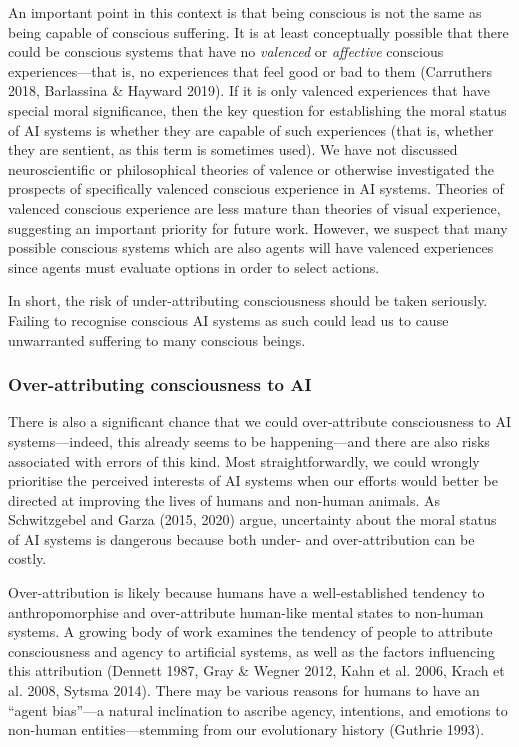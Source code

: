 \documentclass[12pt]{article}
\begin{document}
An important point in this context is that being conscious is not the same as being capable of conscious suffering. It is at least conceptually possible that there could be conscious systems that have no \textit{valenced} or \textit{affective} conscious experiences—that is, no experiences that feel good or bad to them (Carruthers 2018, Barlassina \& Hayward 2019). If it is only valenced experiences that have special moral significance, then the key question for establishing the moral status of AI systems is whether they are capable of such experiences (that is, whether they are sentient, as this term is sometimes used). We have not discussed neuroscientific or philosophical theories of valence or otherwise investigated the prospects of specifically valenced conscious experience in AI systems. Theories of valenced conscious experience are less mature than theories of visual experience, suggesting an important priority for future work. However, we suspect that many possible conscious systems which are also agents will have valenced experiences since agents must evaluate options in order to select actions.

In short, the risk of under-attributing consciousness should be taken seriously. Failing to recognise conscious AI systems as such could lead us to cause unwarranted suffering to many conscious beings.

\subsubsection{Over-attributing consciousness to AI}

There is also a significant chance that we could over-attribute consciousness to AI systems—indeed, this already seems to be happening—and there are also risks associated with errors of this kind. Most straightforwardly, we could wrongly prioritise the perceived interests of AI systems when our efforts would better be directed at improving the lives of humans and non-human animals. As Schwitzgebel and Garza (2015, 2020) argue, uncertainty about the moral status of AI systems is dangerous because both under- and over-attribution can be costly.

Over-attribution is likely because humans have a well-established tendency to anthropomorphise and over-attribute human-like mental states to non-human systems. A growing body of work examines the tendency of people to attribute consciousness and agency to artificial systems, as well as the factors influencing this attribution (Dennett 1987, Gray \& Wegner 2012, Kahn et al. 2006, Krach et al. 2008, Sytsma 2014). There may be various reasons for humans to have an ``agent bias''—a natural inclination to ascribe agency, intentions, and emotions to non-human entities—stemming from our evolutionary history (Guthrie 1993).
\end{document}
